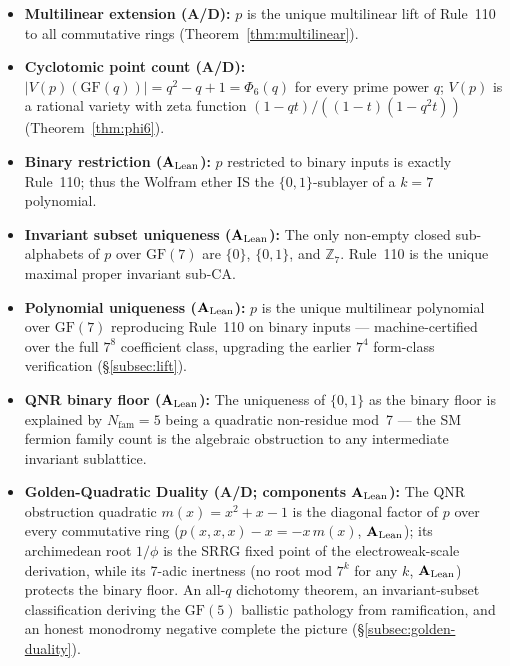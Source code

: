 \documentclass[11pt]{article}
\theoremstyle{remark}
\newcommand{\ZS}{\ensuremath{\mathbb{Z}_7}}
\newcommand{\GF}[1]{\ensuremath{\mathrm{GF}(#1)}}
\newcommand{\lean}[1]{%
  \penalty-100
  \begingroup\def\_{\textunderscore\allowbreak}\texttt{#1}\endgroup}
\newcommand{\CatAL}{\texorpdfstring{\ensuremath{\textbf{A}_{\rm Lean}}}{A-Lean}}
\newcommand{\CatAD}{\textbf{A/D}}
\begin{document}
\begin{itemize}[leftmargin=2em,itemsep=2pt,topsep=4pt]
        $T$ (Object~T, integer arithmetic cascade). Objects~0 and~T are
        co-selected siblings; $T$ is proved non-polynomial over $\GF{7}$
        (\CatAL{}, \lean{T\_b\_output\_not\_determined\_by\_mod7},
        \lean{UgpLean/Polynomial/PolyExplorations.lean}).
  \item \textbf{Multilinear extension (\CatAD{}):} $p$ is the unique multilinear
        lift of Rule~110 to all commutative rings (Theorem~\ref{thm:multilinear}).
  \item \textbf{Cyclotomic point count (\CatAD{}):} $|V(p)(\GF{q})| = q^2-q+1 =
        \Phi_6(q)$ for every prime power $q$; $V(p)$ is a rational variety with
        zeta function $(1-qt)/((1-t)(1-q^2t))$ (Theorem~\ref{thm:phi6}).
  \item \textbf{Binary restriction (\CatAL{}):} $p$ restricted to binary inputs
        is exactly Rule~110; thus the Wolfram ether IS the $\{0,1\}$-sublayer of
        a $k{=}7$ polynomial.
  \item \textbf{Invariant subset uniqueness (\CatAL{}):} The only non-empty
        closed sub-alphabets of $p$ over $\GF{7}$ are $\{0\}$, $\{0,1\}$, and
        $\ZS$. Rule~110 is the unique maximal proper invariant sub-CA.
  \item \textbf{Polynomial uniqueness (\CatAL{}):} $p$ is the unique
        multilinear polynomial over $\GF{7}$ reproducing Rule~110 on binary
        inputs --- machine-certified over the full $7^{8}$ coefficient class,
        upgrading the earlier $7^{4}$ form-class verification
        (§\ref{subsec:lift}).
  \item \textbf{QNR binary floor (\CatAL{}):} The uniqueness of $\{0,1\}$ as the
        binary floor is explained by $N_{\mathrm{fam}} = 5$ being a quadratic
        non-residue mod~7 --- the SM fermion family count is the algebraic
        obstruction to any intermediate invariant sublattice.
  \item \textbf{Golden-Quadratic Duality (\CatAD{}; components \CatAL{}):}
        The QNR obstruction quadratic $m(x) = x^2+x-1$ is the diagonal
        factor of $p$ over every commutative ring
        ($p(x,x,x) - x = -x\,m(x)$, \CatAL{}); its archimedean root
        $1/\phi$ is the SRRG fixed point of the electroweak-scale
        derivation, while its 7-adic inertness (no root mod $7^k$ for any
        $k$, \CatAL{}) protects the binary floor. An all-$q$ dichotomy
        theorem, an invariant-subset classification deriving the $\GF{5}$
        ballistic pathology from ramification, and an honest monodromy
        negative complete the picture (§\ref{subsec:golden-duality}).

\end{itemize}
\end{document}
